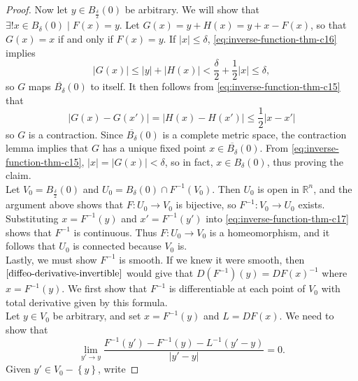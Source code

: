 \documentclass[reqno]{amsart}
\theoremstyle{plain}%
\theoremstyle{definition}
\theoremstyle{remark}
\begin{document}
\begin{proof}
        Now let $y \in B_{\frac{\delta}{2}}(0)$ be arbitrary. We will show that
        $\exists ! x \in B_{\delta}(0)  \mid F(x)=y$. Let
        $G(x) = y + H(x) = y+x-F(x)$, so that $G(x) = x$ if and only if
        $F(x) = y$. If $\left| x \right| \le \delta$,
        \eqref{eq:inverse-function-thm-c16} implies
        \[
        \left| G(x) \right| \le \left| y \right| + \left| H(x) \right| 
        < \frac{\delta}{2} + \frac{1}{2}\left| x \right| \le \delta,
        \tag{$\beta$}\label{eq:inverse-function-thm-c18}
        \] 
        so $G$ maps $\overline{B_{\delta}}(0)$ to itself. It then follows from
        \eqref{eq:inverse-function-thm-c15} that
        \[
        \left| G(x) - G(x') \right| 
        = \left| H(x) - H(x') \right| \le \frac{1}{2} \left| x-x' \right|
        \] 
        so $G$ is a contraction.
        Since $\overline{B_{\delta}}(0)$ is a complete metric space, the
        contraction lemma implies that $G$ has a unique fixed point 
        $x \in \overline{B_{\delta}}(0)$. From \eqref{eq:inverse-function-thm-c15}, 
        $\left| x \right| = \left| G(x) \right| < \delta$, so in fact,
        $x \in B_{\delta}(0)$, thus proving the claim.\\
        \linebreak
        Let $V_0 = B_{\frac{\delta}{2}}(0)$ and $U_0
        = B_{\delta}(0) \cap F^{-1}(V_0)$. Then
        $U_0$ is open in $\mathbb{R}^{n}$, and the argument above shows that 
        $F  \colon U_0 \to V_0$ is bijective, so
        $F^{-1}  \colon V_0 \to U_0$ exists. Substituting
        $x = F^{-1}(y)$ and $x' = F^{-1}(y')$ into
        \eqref{eq:inverse-function-thm-c17} shows that $F^{-1}$ is continuous. Thus
        $F  \colon U_0 \to V_0$ is a homeomorphism, and it follows that $U_0$ is
        connected because $V_0$ is.\\
        \linebreak
        Lastly, we must show $F^{-1}$ is smooth. If we knew it were smooth,
        then $\ref{diffeo-derivative-invertible}$ would give that
        $D\left( F^{-1} \right) (y) = DF (x)^{-1}$ where
        $x = F^{-1}(y)$. We first show that $F^{-1}$ is differentiable at each
        point of $V_0$ with total derivative given by this formula.\\
        Let $y \in V_0$ be arbitrary, and set $x = F^{-1}(y)$ and 
        $L = DF(x)$. We need to show that
        \[
        \lim_{y' \to y} \frac{F^{-1}(y') - F^{-1}(y) - L^{-1}(y'-y)}{\left| y'-y \right| }
        = 0.
        \] 
        Given $y' \in V_0 - \left\{ y \right\} $, write

\end{proof}
\end{document}
